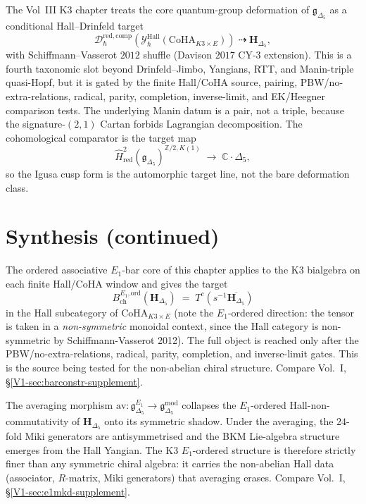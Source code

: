 \begin{remark}
\label{rem:oackd-core-hall-drinfeld}
The Vol~III K3 chapter treats the core quantum-group deformation of
$\mathfrak{g}_{\Delta_5}$ as a conditional Hall--Drinfeld target
\[
\mathcal{D}_\hbar^{\mathrm{red},\mathrm{comp}}
  (\mathcal{Y}^{\mathrm{Hall}}_\hbar(\mathrm{CoHA}_{K3 \times E}))
\;\dashrightarrow\;
\mathbf H_{\Delta_5},
\]
with Schiffmann--Vasserot $2012$ shuffle (Davison $2017$ CY-$3$
extension). This is a fourth taxonomic slot beyond Drinfeld--Jimbo,
Yangians, RTT, and Manin-triple quasi-Hopf, but it is gated by the
finite Hall/CoHA source, pairing, PBW/no-extra-relations, radical,
parity, completion, inverse-limit, and EK/Heegner comparison tests.
The underlying Manin datum is a pair, not a triple, because the
signature-$(2,1)$ Cartan forbids Lagrangian decomposition. The
cohomological comparator is the target map
\[
\widehat H^2_{\mathrm{red}}\!
  \left(\mathfrak{g}_{\Delta_5}\right)^{\mathbb{Z}/2, K(1)}
\;\longrightarrow\;
\mathbb{C} \cdot \Delta_5,
\]
so the Igusa cusp form is the automorphic target line, not the bare
deformation class.
\end{remark}

\section{Synthesis (continued)}
\label{sec:oackd-deep}

\begin{remark}
\label{rem:oackd-deep-1}
The ordered associative $E_1$-bar core of this chapter applies to the
K3 bialgebra on each finite Hall/CoHA window and gives the target
\[
B^{E_1,\mathrm{ord}}_{\mathrm{ch}}(\mathbf H_{\Delta_5}) \;=\; T^c(s^{-1}\overline{\mathbf H_{\Delta_5}})
\]
in the Hall subcategory of $\mathrm{CoHA}_{K3\times E}$ (note the
$E_1$-ordered direction: the tensor is taken in a \emph{non-symmetric}
monoidal context, since the Hall category is non-symmetric by
Schiffmann-Vasserot 2012). The full object is reached only after the
PBW/no-extra-relations, radical, parity, completion, and inverse-limit
gates. This is the source being tested for the non-abelian chiral
structure. Compare Vol.~I,
\S\ref{V1-sec:barconstr-supplement}.
\end{remark}

\begin{remark}
\label{rem:oackd-deep-2}
The averaging morphism
$\mathrm{av}:\mathfrak g^{E_1}_{\Delta_5}\to\mathfrak g^{\mathrm{mod}}_{\Delta_5}$
collapses the $E_1$-ordered Hall-non-commutativity of
$\mathbf H_{\Delta_5}$ onto its symmetric shadow. Under the averaging,
the $24$-fold Miki generators are antisymmetrised and the BKM
Lie-algebra structure emerges from the Hall Yangian. The K3
$E_1$-ordered structure is therefore strictly finer than any
symmetric chiral algebra: it carries the non-abelian Hall data
(associator, $R$-matrix, Miki generators) that averaging erases.
Compare Vol.~I, \S\ref{V1-sec:e1mkd-supplement}.
\end{remark}
